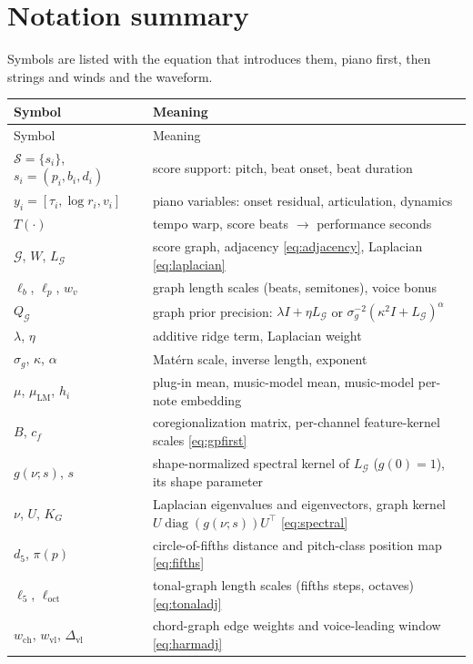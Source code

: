 \documentclass[11pt,a4paper]{report}
\newcommand{\score}{\mathcal{S}}
\newcommand{\graph}{\mathcal{G}}
\newcommand{\Qg}{Q_{\graph}}
\newcommand{\Lg}{L_{\graph}}
\newcommand{\muLM}{\mu_{\mathrm{LM}}}  %
\begin{document}
\chapter{Notation summary}\label{app:notation}
Symbols are listed with the equation that introduces them, piano first,
then strings and winds and the waveform.
\begin{center}
\begin{longtable}{@{}p{4.3cm}p{9.2cm}@{}}
\toprule
Symbol & Meaning \\
\midrule
\endfirsthead
\toprule
Symbol & Meaning \\
\midrule
\endhead
\bottomrule
\endfoot
$\score = \{s_i\}$, $s_i = (p_i, b_i, d_i)$ & score support: pitch, beat onset, beat duration \\
$y_i = [\tau_i, \log r_i, v_i]$ & piano variables: onset residual, articulation, dynamics \\
$T(\cdot)$ & tempo warp, score beats $\to$ performance seconds \\
$\graph$, $W$, $\Lg$ & score graph, adjacency \eqref{eq:adjacency}, Laplacian \eqref{eq:laplacian} \\
$\ell_b$, $\ell_p$, $w_v$ & graph length scales (beats, semitones), voice bonus \\
$\Qg$ & graph prior precision: $\lambda I + \eta \Lg$ or $\sigma_g^{-2}(\kappa^2 I + \Lg)^\alpha$ \\
$\lambda$, $\eta$ & additive ridge term, Laplacian weight \\
$\sigma_g$, $\kappa$, $\alpha$ & Mat\'ern scale, inverse length, exponent \\
$\mu$, $\muLM$, $h_i$ & plug-in mean, music-model mean, music-model per-note embedding \\
$B$, $c_f$ & coregionalization matrix, per-channel feature-kernel scales \eqref{eq:gpfirst} \\
$g(\nu; s)$, $s$ & shape-normalized spectral kernel of $\Lg$ ($g(0){=}1$), its shape parameter \\
$\nu$, $U$, $K_G$ & Laplacian eigenvalues and eigenvectors, graph kernel $U \operatorname{diag}(g(\nu;s)) U^\top$ \eqref{eq:spectral} \\
$d_5$, $\pi(p)$ & circle-of-fifths distance and pitch-class position map \eqref{eq:fifths} \\
$\ell_5$, $\ell_{\mathrm{oct}}$ & tonal-graph length scales (fifths steps, octaves) \eqref{eq:tonaladj} \\
$w_{\mathrm{ch}}$, $w_{\mathrm{vl}}$, $\Delta_{\mathrm{vl}}$ & chord-graph edge weights and voice-leading window \eqref{eq:harmadj} \\

\end{longtable}
\end{center}
\end{document}
